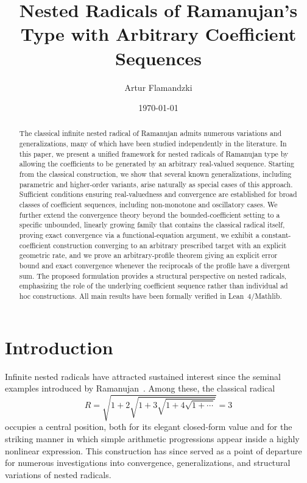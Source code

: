 \documentclass[11pt,a4paper]{amsart}
\title{Nested Radicals of {Ramanujan}'s Type with Arbitrary Coefficient Sequences}
\author{Artur Flamandzki}
\date{\today}
\theoremstyle{plain}
\theoremstyle{definition}
\theoremstyle{remark}
\begin{document}
\begin{abstract}
The classical infinite nested radical of Ramanujan admits numerous variations and generalizations, many of which have been studied independently in the literature. In this paper, we present a unified framework for nested radicals of Ramanujan type by allowing the coefficients to be generated by an arbitrary real-valued sequence. Starting from the classical construction, we show that several known generalizations, including parametric and higher-order variants, arise naturally as special cases of this approach. Sufficient conditions ensuring real-valuedness and convergence are established for broad classes of coefficient sequences, including non-monotone and oscillatory cases. We further extend the convergence theory beyond the bounded-coefficient setting to a specific unbounded, linearly growing family that contains the classical radical itself, proving exact convergence via a functional-equation argument, we exhibit a constant-coefficient construction converging to an arbitrary prescribed target with an explicit geometric rate, and we prove an arbitrary-profile theorem giving an explicit error bound and exact convergence whenever the reciprocals of the profile have a divergent sum. The proposed formulation provides a structural perspective on nested radicals, emphasizing the role of the underlying coefficient sequence rather than individual ad hoc constructions. All main results have been formally verified in Lean~4/Mathlib.
\end{abstract}

\maketitle

\section{Introduction}

Infinite nested radicals have attracted sustained interest since the seminal examples introduced by Ramanujan~\cite{RamanujanNotebooks}. Among these, the classical radical
\[
R = \sqrt{1 + 2\sqrt{1 + 3\sqrt{1 + 4\sqrt{1 + \cdots}}}} = 3
\]
occupies a central position, both for its elegant closed-form value and for the striking manner in which simple arithmetic progressions appear inside a highly nonlinear expression. This construction has since served as a point of departure for numerous investigations into convergence, generalizations, and structural variations of nested radicals.
\end{document}
